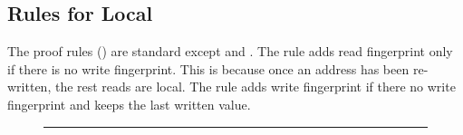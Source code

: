 \subsection{Rules for Local}

The proof rules () are standard except  and .
The  rule adds read fingerprint only if there is no write fingerprint.
This is because once an address has been re-written, the rest reads are local.
The rule adds write fingerprint if there no write fingerprint and keeps the last written value.


\begin{figure}[!t]
\hrule\vspace{5pt}



\end{figure}
